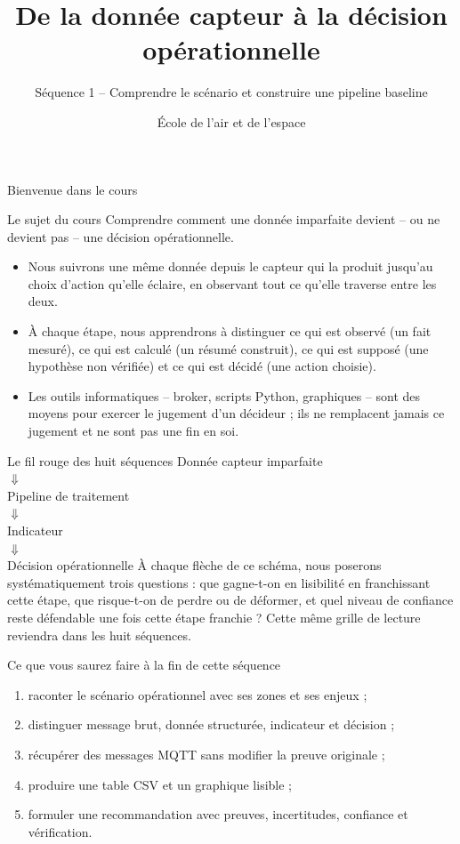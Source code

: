 \documentclass[aspectratio=169]{beamer}
\title{De la donnée capteur à la décision opérationnelle}
\subtitle{Séquence 1 -- Comprendre le scénario et construire une pipeline baseline}
\author{École de l'air et de l'espace}
\date{}
\begin{document}
\begin{frame}
  \titlepage
\end{frame}

\begin{frame}{Bienvenue dans le cours}
  \begin{block}{Le sujet du cours}
    Comprendre comment une donnée imparfaite devient -- ou ne devient pas -- une décision opérationnelle.
  \end{block}
  \begin{itemize}
    \item Nous suivrons une même donnée depuis le capteur qui la produit jusqu'au choix d'action qu'elle éclaire, en observant tout ce qu'elle traverse entre les deux.
    \item À chaque étape, nous apprendrons à distinguer ce qui est observé (un fait mesuré), ce qui est calculé (un résumé construit), ce qui est supposé (une hypothèse non vérifiée) et ce qui est décidé (une action choisie).
    \item Les outils informatiques -- broker, scripts Python, graphiques -- sont des moyens pour exercer le jugement d'un décideur ; ils ne remplacent jamais ce jugement et ne sont pas une fin en soi.
  \end{itemize}
\end{frame}

\begin{frame}{Le fil rouge des huit séquences}
  \centering
  \Large Donnée capteur imparfaite\\[2mm]
  $\Downarrow$\\[-1mm]
  Pipeline de traitement\\[-1mm]
  $\Downarrow$\\[-1mm]
  Indicateur\\[-1mm]
  $\Downarrow$\\[-1mm]
  Décision opérationnelle
  \vfill
  \normalsize À chaque flèche de ce schéma, nous poserons systématiquement trois questions : que gagne-t-on en lisibilité en franchissant cette étape, que risque-t-on de perdre ou de déformer, et quel niveau de confiance reste défendable une fois cette étape franchie ? Cette même grille de lecture reviendra dans les huit séquences.
\end{frame}

\begin{frame}{Ce que vous saurez faire à la fin de cette séquence}
  \begin{enumerate}
    \item raconter le scénario opérationnel avec ses zones et ses enjeux ;
    \item distinguer message brut, donnée structurée, indicateur et décision ;
    \item récupérer des messages MQTT sans modifier la preuve originale ;
    \item produire une table CSV et un graphique lisible ;
    \item formuler une recommandation avec preuves, incertitudes, confiance et vérification.
  \end{enumerate}
\end{frame}
\end{document}
